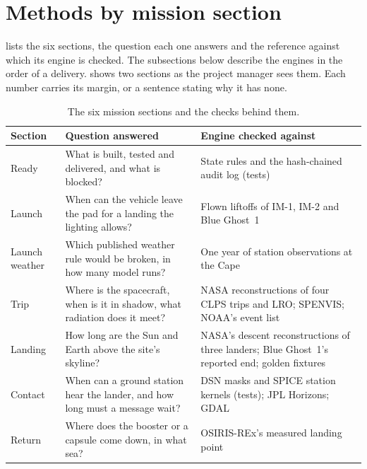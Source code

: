 \documentclass[11pt,a4paper]{article}
\begin{document}
\section{Methods by mission section}
\label{sec:methods}

 lists the six sections, the question each one answers and the
reference against which its engine is checked. The subsections below describe the
engines in the order of a delivery.  shows two sections as the project
manager sees them. Each number carries its margin, or a sentence stating why it has none.

\begin{table}[htbp]
\centering\small
\caption{The six mission sections and the checks behind them.}
\label{tab:sections}
\begin{tabularx}{\textwidth}{@{}l>{\raggedright\arraybackslash}p{}Y@{}}
\toprule
Section & Question answered & Engine checked against \\
\midrule
Ready & What is built, tested and delivered, and what is blocked? & State rules and the
hash-chained audit log (tests) \\
Launch & When can the vehicle leave the pad for a landing the lighting allows? & Flown
liftoffs of IM-1, IM-2 and Blue Ghost~1 \\
Launch weather & Which published weather rule would be broken, in how many model runs? &
One year of station observations at the Cape \\
Trip & Where is the spacecraft, when is it in shadow, what radiation does it meet? & NASA
reconstructions of four CLPS trips and LRO; SPENVIS; NOAA's event list \\
Landing & How long are the Sun and Earth above the site's skyline? & NASA's descent
reconstructions of three landers; Blue Ghost~1's reported end; golden fixtures \\
Contact & When can a ground station hear the lander, and how long must a message wait? &
DSN masks and SPICE station kernels (tests); JPL Horizons; GDAL \\
Return & Where does the booster or a capsule come down, in what sea? & OSIRIS-REx's
measured landing point \\
\bottomrule
\end{tabularx}
\end{table}
\end{document}
